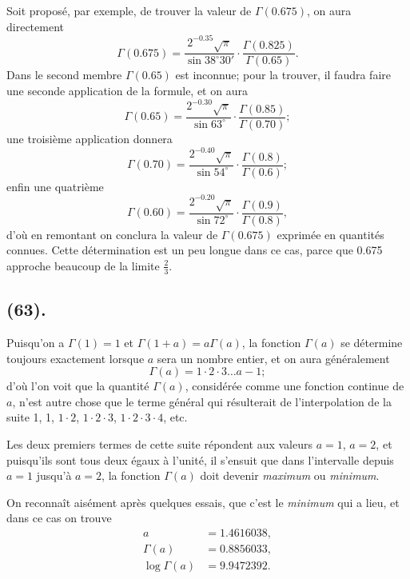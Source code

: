 \documentclass{article}
\begin{document}
Soit proposé, par exemple, de trouver la valeur de $\Gamma(0.675)$, on aura directement
\[ \Gamma(0.675)=\frac{2^{-0.35}\sqrt{\pi}}{\sin 38^{\circ}30'}\cdot\frac{\Gamma(0.825)}{\Gamma(0.65)}. \]
Dans le second membre $\Gamma(0.65)$ est inconnue; pour la trouver, il faudra faire une seconde application de la formule, et on aura
\[ \Gamma(0.65)=\frac{2^{-0.30}\sqrt{\pi}}{\sin 63^{\circ}}\cdot\frac{\Gamma(0.85)}{\Gamma(0.70)}; \]
une troisième application donnera
\[ \Gamma(0.70)=\frac{2^{-0.40}\sqrt{\pi}}{\sin 54^{\circ}}\cdot\frac{\Gamma(0.8)}{\Gamma(0.6)}; \]
enfin une quatrième
\[ \Gamma(0.60)=\frac{2^{-0.20}\sqrt{\pi}}{\sin 72^{\circ}}\cdot\frac{\Gamma(0.9)}{\Gamma(0.8)}, \]
d'où en remontant on conclura la valeur de $\Gamma(0.675)$ exprimée en quantités connues. Cette détermination est un peu longue dans ce cas, parce que 0.675 approche beaucoup de la limite $\frac{2}{3}$.


\subsection*{(63).}

Puisqu'on a $\Gamma(1)=1$ et $\Gamma(1+a)=a\Gamma(a)$, la fonction $\Gamma(a)$ se détermine toujours exactement lorsque $a$ sera un nombre entier, et on aura généralement
\[ \Gamma(a)=1\cdot 2\cdot 3\ldots a-1; \]
d'où l'on voit que la quantité $\Gamma(a)$, considérée comme une fonction continue de $a$, n'est autre chose que le terme général qui résulterait de l'interpolation de la suite 1, 1, $1\cdot 2$, $1\cdot 2\cdot 3$, $1\cdot 2\cdot 3\cdot 4$, etc.

Les deux premiers termes de cette suite répondent aux valeurs $a=1$, $a=2$, et puisqu'ils sont tous deux égaux à l'unité, il s'ensuit que dans l'intervalle depuis $a=1$ jusqu'à $a=2$, la fonction $\Gamma(a)$ doit devenir \emph{maximum} ou \emph{minimum}.

On reconnaît aisément après quelques essais, que c'est le \emph{minimum} qui a lieu, et dans ce cas on trouve
\[ \begin{aligned} a&=1.4616038,\\ \Gamma(a)&=0.8856033,\\ \log\Gamma(a)&=9.9472392. \end{aligned} \]
\end{document}
